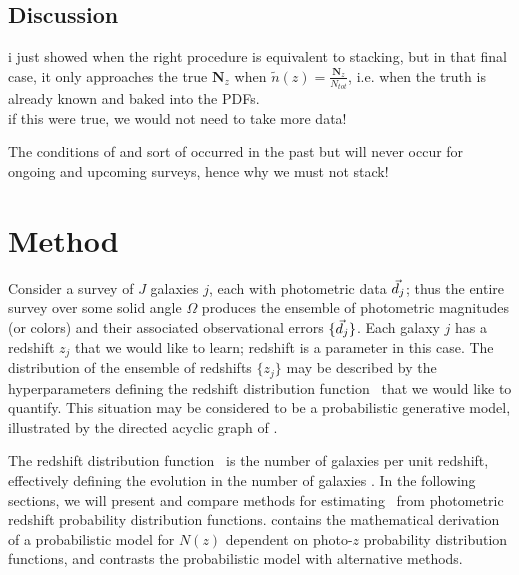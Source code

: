 
\subsection{Discussion}

i just showed when the right procedure is equivalent to stacking, but in that final case, it only approaches the true $\textbf{N}_{z}$ when $\tilde{n}(z) = \frac{\textbf{N}_{z}}{N_{tot}}$, i.e. when the truth is already known and baked into the PDFs.\\
if this were true, we would not need to take more data!

The conditions of  and  sort of occurred in the past but will never occur for ongoing and upcoming surveys, hence why we must not stack!

\section{Method}


Consider a survey of $J$ galaxies $j$, each with photometric data $\vec{d}_{j}$; thus the entire survey over some solid angle $\Omega$ produces the ensemble of photometric magnitudes (or colors) and their associated observational errors $\{\vec{d}_{j}\}$.  
Each galaxy $j$ has a redshift $z_{j}$ that we would like to learn; redshift is a parameter in this case.  
The distribution of the ensemble of redshifts $\{z_{j}\}$ may be described by the hyperparameters defining the redshift distribution function \Nz\ that we would like to quantify.  
This situation may be considered to be a probabilistic generative model, illustrated by the directed acyclic graph of .  



The redshift distribution function \Nz\ is the number of galaxies per unit redshift, effectively defining the evolution in the number of galaxies \citep{Menard2013}.  
In the following sections, we will present and compare methods for estimating \Nz\ from photometric redshift probability distribution functions.  
 contains the mathematical derivation of a probabilistic model for $N(z)$ dependent on photo-$z$ probability distribution functions, and  contrasts the probabilistic model with alternative methods.

